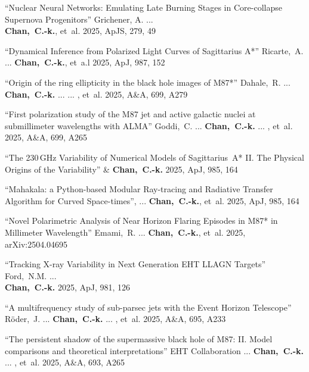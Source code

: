 \begin{ilist}
\item ``Nuclear Neural Networks: Emulating Late Burning Stages in Core-collapse Supernova Progenitors''
  Grichener, A. ...\\ \textbf{Chan,~C.-k.}, et~al.
  2025, ApJS, 279, 49

\item ``Dynamical Inference from Polarized Light Curves of Sagittarius A*''
  Ricarte,~A. ... \textbf{Chan,~C.-k.}, et~a.l
  2025, ApJ, 987, 152

\item ``Origin of the ring ellipticity in the black hole images of M87*''
  Dahale,~R. ... \textbf{Chan,~C.-k.} ...  ... , et~al.
  2025, A\&A, 699, A279

\item ``First polarization study of the M87 jet and active galactic nuclei at submillimeter wavelengths with ALMA''
  Goddi,~C. ... \textbf{Chan,~C.-k.} ... , et~al.
  2025, A\&A, 699, A265

\item ``The 230\,GHz Variability of Numerical Models of Sagittarius~A* II. The Physical Origins of the Variability''
   \& \textbf{Chan,~C.-k.}
  2025, ApJ, 985, 164

\item ``Mahakala: a Python-based Modular Ray-tracing and Radiative Transfer Algorithm for Curved Space-times'',
   ... \textbf{Chan,~C.-k.}, et~al.
  2025, ApJ, 985, 164

\item ``Novel Polarimetric Analysis of Near Horizon Flaring Episodes in M87* in Millimeter Wavelength''
  Emami,~R. ... \textbf{Chan,~C.-k.}, et~al.
  2025, arXiv:2504.04695

\item ``Tracking X-ray Variability in Next Generation EHT LLAGN Targets''
  Ford,~N.M. ...\\ \textbf{Chan,~C.-k.}
  2025, ApJ, 981, 126

\item ``A multifrequency study of sub-parsec jets with the Event Horizon Telescope''
  R\"oder,~J. ... \textbf{Chan,~C.-k.} ... , et~al.
  2025, A\&A, 695, A233

\item ``The persistent shadow of the supermassive black hole of M87: II. Model comparisons and theoretical interpretations''
  EHT Collaboration ... \textbf{Chan,~C.-k.} ... , et~al.
  2025, A\&A, 693, A265


\end{ilist}
